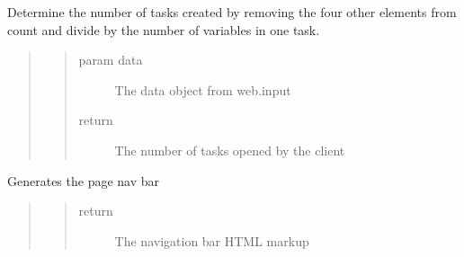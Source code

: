 \documentclass[letterpaper,10pt,english]{sphinxmanual}
\begin{document}
\begin{fulllineitems}
\label{\detokenize{index:views.utils.get_element_count}}
Determine the number of tasks created by removing 
the four other elements from count and divide by the 
number of variables in one task.
\begin{quote}
\begin{quote}\begin{description}
\item[{param data}] \leavevmode
The data object from web.input

\item[{return}] \leavevmode
The number of tasks opened by the client

\end{description}\end{quote}
\end{quote}

\end{fulllineitems}


\begin{fulllineitems}
\label{\detokenize{index:views.utils.get_nav_bar}}
Generates the page nav bar
\begin{quote}
\begin{quote}\begin{description}
\item[{return}] \leavevmode
The navigation bar HTML markup

\end{description}\end{quote}
\end{quote}

\end{fulllineitems}

\label{\detokenize{index:module-models.login}}
\end{document}
